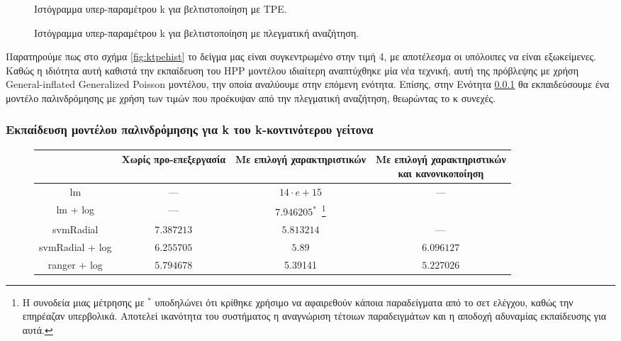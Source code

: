 \begin{figure}[!htb]
	\begin{minipage}{0.48\textwidth}
						\scalebox{0.4}{
							}
							\captionsetup[subfigure]{width=0.8\textwidth}
							\caption{Ιστόγραμμα υπερ-παραμέτρου k για βελτιστοποίηση με \gls{TPE}.}
						\label{fig:ktpehist}
	\end{minipage}
	\begin{minipage}{0.48\textwidth}
						\scalebox{0.4}{
			}
			\captionsetup[subfigure]{width=0.8\textwidth}
				\caption{Ιστόγραμμα υπερ-παραμέτρου k για βελτιστοποίηση με πλεγματική αναζήτηση.}
		    \label{fig:kgridhist}
	\end{minipage}
\end{figure}

Παρατηρούμε πως στο σχήμα \ref{fig:ktpehist} το δείγμα μας είναι συγκεντρωμένο στην τιμή 4, με αποτέλεσμα οι υπόλοιπες να είναι εξωκείμενες. Καθώς η ιδιότητα αυτή καθιστά την εκπαίδευση του \gls{HPP} μοντέλου ιδιαίτερη αναπτύχθηκε μία νέα τεχνική, αυτή της πρόβλεψης με χρήση General-inflated Generalized Poisson μοντέλου, την οποία αναλύουμε στην επόμενη ενότητα. Επίσης, στην Ενότητα \ref{section:HPPk} θα εκπαιδεύσουμε ένα μοντέλο παλινδρόμησης με χρήση των τιμών που προέκυψαν από την πλεγματική αναζήτηση, θεωρώντας το κ συνεχές. 


\subsubsection{Εκπαίδευση μοντέλου παλινδρόμησης για k του k-κοντινότερου γείτονα} \label{section:HPPk}
\begin{figure}[!htb]
	\footnotesize
	\begin{center}
		\begin{tabular}{ |c|c|c|c| } 
			\hline
			& Χωρίς προ-επεξεργασία & Με επιλογή χαρακτηριστικών & \pbox{20cm}{Με επιλογή χαρακτηριστικών\\ και κανονικοποίηση} \\
			\hline
			lm & --- & $14 \cdot e+15$ &  --- \\
			\hline
			lm + log & --- & $7.946205 ^{*}$~\footnote{Η συνοδεία μιας μέτρησης με $^*$ υποδηλώνει ότι κρίθηκε χρήσιμο να αφαιρεθούν κάποια παραδείγματα από το σετ ελέγχου, καθώς την επηρέαζαν υπερβολικά. Αποτελεί ικανότητα του συστήματος η αναγνώριση τέτοιων παραδειγμάτων και η αποδοχή αδυναμίας εκπαίδευσης για αυτά. }& \\
			\hline
			svmRadial & $7.387213$ &$5.813214$& --- \\
			\hline
			svmRadial + log& $6.255705$ & $5.89$& $6.096127$\\
			\hline
			ranger + log  & $5.794678$ & 5.39141 & $\bm{5.227026}$\\
			\hline
		\end{tabular}   
	\end{center}
\end{figure}


